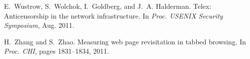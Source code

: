 \documentclass[twocolumn,10pt]{article}
\begin{document}
\begin{thebibliography}{10}
E.~Wustrow, S.~Wolchok, I.~Goldberg, and J.~A. Halderman.
\newblock Telex: Anticensorship in the network infrastructure.
\newblock In {\em Proc. {USENIX} Security Symposium}, Aug. 2011.

H.~Zhang and S.~Zhao.
\newblock Measuring web page revisitation in tabbed browsing.
\newblock In {\em Proc. CHI}, pages 1831--1834, 2011.

\end{thebibliography}
\end{document}
